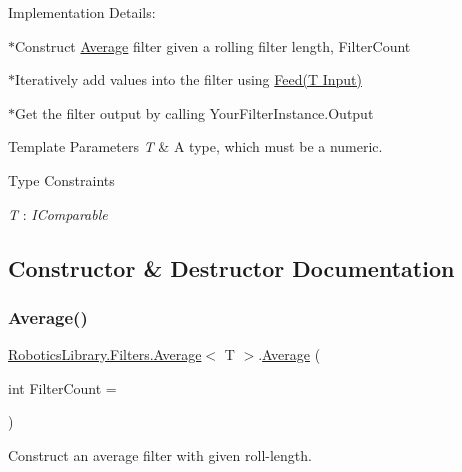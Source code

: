 Implementation Details\+:

$\ast$\+Construct \hyperlink{class_robotics_library_1_1_filters_1_1_average}{Average} filter given a rolling filter length, {\ttfamily Filter\+Count}

$\ast$\+Iteratively add values into the filter using {\ttfamily \hyperlink{class_robotics_library_1_1_filters_1_1_average_a27479a3706425bb721a7694acd388cdd}{Feed(\+T Input)}}

$\ast$\+Get the filter output by calling {\ttfamily Your\+Filter\+Instance.\+Output}


\begin{DoxyTemplParams}{Template Parameters}
{\em T} & A type, which must be a numeric.\\
\hline
\end{DoxyTemplParams}
\begin{Desc}
\item[Type Constraints]\begin{description}
\item[{\em T} : {\em I\+Comparable}]\end{description}
\end{Desc}


\subsection{Constructor \& Destructor Documentation}
\mbox{\label{class_robotics_library_1_1_filters_1_1_average_aa1f1ba91014e9fe0b966650b9ccbf514}} 
\subsubsection{\texorpdfstring{Average()}{Average()}}
{\footnotesize\ttfamily \hyperlink{class_robotics_library_1_1_filters_1_1_average}{Robotics\+Library.\+Filters.\+Average}$<$ T $>$.\hyperlink{class_robotics_library_1_1_filters_1_1_average}{Average} (\begin{DoxyParamCaption}\item[{int}]{Filter\+Count = {} }\end{DoxyParamCaption})}



Construct an average filter with given roll-\/length. 


